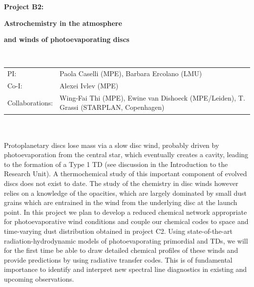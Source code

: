 \documentclass[10pt,fleqn,twoside]{article}
\newcommand{\Tcol}{\color{blue}}
\begin{document}
\newpage


\setcounter{page}{1}

\centerline{\huge\bf\Tcol
%
%
%
%
%
 Project B2:}

\centerline{\huge\bf\Tcol Astrochemistry in the atmosphere} 
\centerline{\huge\bf\Tcol and winds of photoevaporating discs}

%
%
%
%
%
\vskip1.0cm


\\
\begin{tabular}{ll}
{\textsf{PI:}}                   & Paola Caselli (MPE), Barbara Ercolano (LMU) \\
{\textsf{Co-I:}}                & Alexei Ivlev (MPE)\\
{\textsf{Collaborations:}}      &Wing-Fai Thi (MPE), Ewine van Dishoeck (MPE/Leiden), T. Grassi (STARPLAN, Copenhagen) \\

\end{tabular}


\vspace{1em}
 \\

\vspace{1em}
\\

Protoplanetary discs lose mass via a slow disc wind, probably driven by photoevaporation from the central star, which eventually creates a cavity, leading to the formation of a Type 1 TD (see discussion in the Introduction to the Research Unit). A thermochemical study of this important component of evolved discs does not exist to date. The study of the chemistry in disc winds however relies on a knowledge of the opacities, which are largely dominated by small dust grains which are entrained in the wind from the underlying disc at the launch point. In this project we plan to develop a reduced chemical network appropriate for photoevaporative wind conditions and couple our chemical codes to space and time-varying dust distribution obtained in project C2. Using state-of-the-art radiation-hydrodynamic models of photoevaporating primordial and TDs, we will for the first time be able to draw detailed chemical profiles of these winds and provide predictions by using radiative transfer codes. This is of fundamental importance to identify and interpret new spectral line diagnostics in existing and upcoming observations. 
\end{document}

